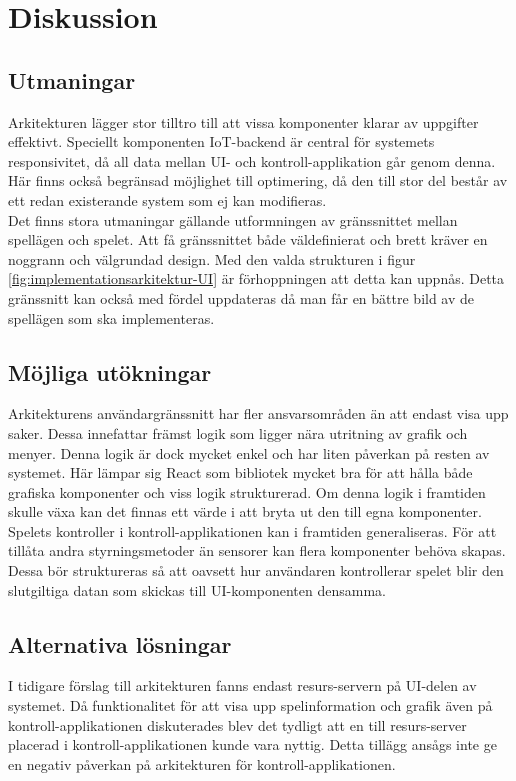 \section{Diskussion}
\subsection{Utmaningar}
Arkitekturen lägger stor tilltro till att vissa komponenter klarar av uppgifter effektivt. Speciellt komponenten IoT-backend är central för systemets responsivitet, då all data mellan UI- och kontroll-applikation går genom denna. Här finns också begränsad möjlighet till optimering, då den till stor del består av ett redan existerande system som ej kan modifieras.\\

Det finns stora utmaningar gällande utformningen av gränssnittet mellan spellägen och spelet. Att få gränssnittet både väldefinierat och brett kräver en noggrann och välgrundad design. Med den valda strukturen i figur \ref{fig:implementationsarkitektur-UI} är förhoppningen att detta kan uppnås. Detta gränssnitt kan också med fördel uppdateras då man får en bättre bild av de spellägen som ska implementeras.\\

\subsection{Möjliga utökningar}
Arkitekturens användargränssnitt har fler ansvarsområden än att endast visa upp saker. Dessa innefattar främst logik som ligger nära utritning av grafik och menyer. Denna logik är dock mycket enkel och har liten påverkan på resten av systemet. Här lämpar sig React som bibliotek mycket bra för att hålla både grafiska komponenter och viss logik strukturerad. Om denna logik i framtiden skulle växa kan det finnas ett värde i att bryta ut den till egna komponenter.\\

Spelets kontroller i kontroll-applikationen kan i framtiden generaliseras. För att tillåta andra styrningsmetoder än sensorer kan flera komponenter behöva skapas. Dessa bör struktureras så att oavsett hur användaren kontrollerar spelet blir den slutgiltiga datan som skickas till UI-komponenten densamma.\\

\subsection{Alternativa lösningar}
I tidigare förslag till arkitekturen fanns endast resurs-servern på UI-delen av systemet. Då funktionalitet för att visa upp spelinformation och grafik även på kontroll-applikationen diskuterades blev det tydligt att en till resurs-server placerad i kontroll-applikationen kunde vara nyttig. Detta tillägg ansågs inte ge en negativ påverkan på arkitekturen för kontroll-applikationen.\\

